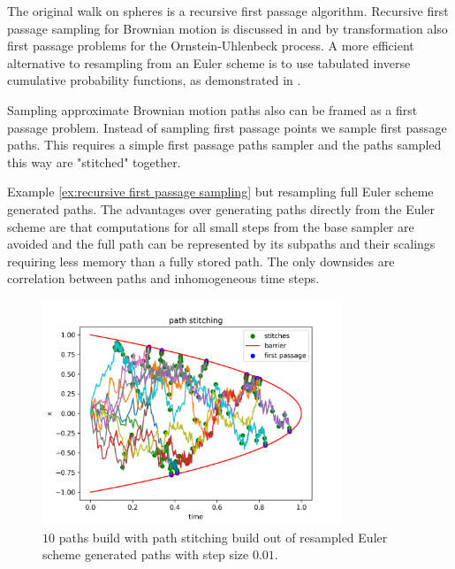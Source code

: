 \documentclass[a4paper,12pt]{article}
\begin{document}
\begin{related}
  The original walk on spheres is a recursive first passage algorithm.
  Recursive first passage sampling for
  Brownian motion is discussed in \cite{herrmann_first-passage_2016}
  and by transformation also first passage problems for the
  Ornstein-Uhlenbeck process.
  A more efficient alternative to resampling from an Euler scheme is to use tabulated
  inverse cumulative probability functions,
  as demonstrated in \cite{hwang_simulationtabulation_2001}.
\end{related}


\begin{technique}
  Sampling approximate Brownian motion paths also can be
  framed as a first passage problem. Instead of sampling
  first passage points we sample first passage paths.
  This requires a simple first passage paths sampler and the paths
  sampled this way are "stitched" together.
\end{technique}

\begin{example}
  Example \ref{ex:recursive first passage sampling} but
  resampling full Euler scheme generated paths.
  The advantages over generating paths directly from
  the Euler scheme are that computations for all small steps from the
  base sampler are avoided and the full path
  can be represented by its subpaths and their scalings
  requiring less memory than a fully stored path.
  The only downsides are correlation between paths and
  inhomogeneous time steps.

  \begin{figure}[h!]
    \centering
    \includegraphics[width=0.8\textwidth]{plots/path_stitching_para.png}
    \caption{ $10$ paths build with path stitching build out of
      resampled Euler scheme generated paths with step size $0.01$.}
    \label{fig:path stitching para}
  \end{figure}
\end{example}
\end{document}
